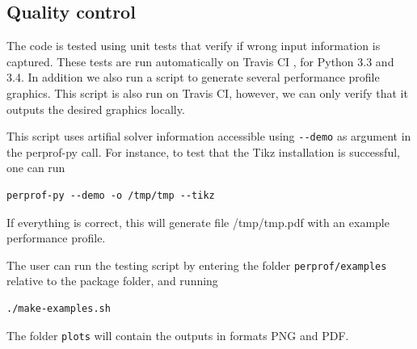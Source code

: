 \subsection*{Quality control}

    The code is tested using unit tests that verify if wrong input information
    is captured. These tests are run automatically on Travis CI
    \cite{url:travis}, for Python 3.3 and 3.4.
    In addition we also run a script to generate several performance profile
    graphics. This script is also run on Travis CI, however, we can only verify
    that it outputs the desired graphics locally.

    This script uses artifial solver information accessible using \verb+--demo+
    as argument in the perprof-py call.
    For instance, to test that the Tikz installation is successful, one can run
\begin{verbatim}
perprof-py --demo -o /tmp/tmp --tikz
\end{verbatim}
    If everything is correct, this will generate file /tmp/tmp.pdf with an
    example performance profile.

    The user can run the testing script
    by entering the folder
    \verb+perprof/examples+ relative to the package folder, and running
\begin{verbatim}
./make-examples.sh
\end{verbatim}
    The folder \verb+plots+ will contain the outputs in formats PNG and PDF.
